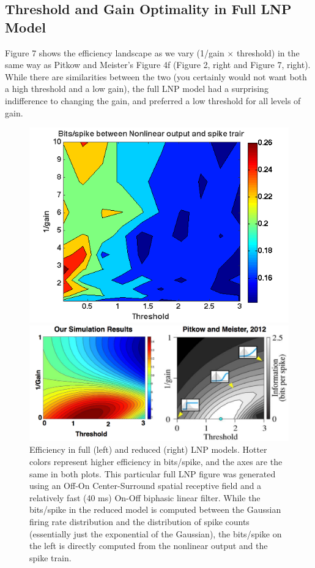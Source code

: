 \documentclass[12pt]{article}
\begin{document}
\subsection{Threshold and Gain Optimality in Full LNP Model}
Figure 7 shows the efficiency landscape as we vary (1/gain $\times$ threshold) in the same way as Pitkow and Meister's Figure 4f (Figure 2, right and Figure 7, right).  While there are similarities between the two (you certainly would not want both a high threshold and a low gain), the full LNP model had a surprising indifference to changing the gain, and preferred a low threshold for all levels of gain.

\begin{figure}[h!!]
\centering
\begin{minipage}[b]{0.48\linewidth}
\centering
\includegraphics[width=\textwidth]{4f_contour_LNPsimulation_OFFcell.png}
\end{minipage}
\begin{minipage}[b]{0.48\linewidth}
\centering
\includegraphics[scale=0.36]{ReplicationOf4f_justOurs.pdf}
\end{minipage}
\caption{Efficiency in full (left) and reduced (right) LNP models.  Hotter colors represent higher efficiency in bits/spike, and the axes are the same in both plots.  This particular full LNP figure was generated using an Off-On Center-Surround spatial receptive field and a relatively fast (40 ms) On-Off biphasic linear filter.  While the bits/spike in the reduced model is computed between the Gaussian firing rate distribution and the distribution of spike counts (essentially just the exponential of the Gaussian), the bits/spike on the left is directly computed from the nonlinear output and the spike train.}
\label{Figure 7}
\end{figure}
\end{document}
